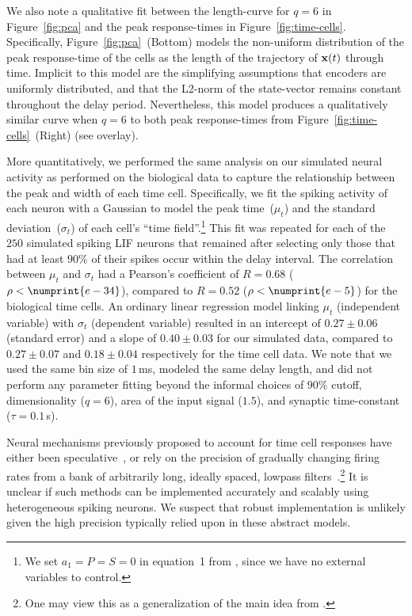 
We also note a qualitative fit between the length-curve for $q=6$ in Figure~\ref{fig:pca} and the peak response-times in Figure~\ref{fig:time-cells}.
Specifically, Figure~\ref{fig:pca}~(Bottom) models the non-uniform distribution of the peak response-time of the cells as the length of the trajectory of $\mathbf{x}(t)$ through time.
Implicit to this model are the simplifying assumptions that encoders are uniformly distributed, and that the L2-norm of the state-vector remains constant throughout the delay period.
Nevertheless, this model produces a qualitatively similar curve when $q = 6$ to both peak response-times from Figure~\ref{fig:time-cells}~(Right) (see overlay).

More quantitatively, we performed the same analysis on our simulated neural activity as \citet{tiganj2016sequential} performed on the biological data to capture the relationship between the peak and width of each time cell.
Specifically, we fit the spiking activity of each neuron with a Gaussian to model the peak time~($\mu_t$) and the standard deviation~($\sigma_t$) of each cell's ``time field''.\footnote{%
We set $a_1 = P = S = 0$ in equation~1 from \citet{tiganj2016sequential}, since we have no external variables to control.
}
This fit was repeated for each of the $250$ simulated spiking LIF neurons that remained after selecting only those that had at least $90\%$ of their spikes occur within the delay interval.
The correlation between $\mu_t$ and $\sigma_t$ had a Pearson's coefficient of $R = 0.68$ ($\rho < \numprint{e-34}$), compared to $R = 0.52$ ($\rho < \numprint{e-5}$) for the biological time cells.
An ordinary linear regression model linking $\mu_t$ (independent variable) with $\sigma_t$ (dependent variable) resulted in an intercept of $0.27 \pm 0.06$ (standard error) and a slope of $0.40 \pm 0.03$ for our simulated data, compared to $0.27 \pm 0.07$ and $0.18 \pm 0.04$ respectively for the time cell data.
We note that we used the same bin size of $1$\,ms, modeled the same delay length, and did not perform any parameter fitting beyond the informal choices of $90\%$ cutoff, dimensionality ($q=6$), area of the input signal ($1.5$), and synaptic time-constant ($\tau = 0.1$\,s).

Neural mechanisms previously proposed to account for time cell responses have either been speculative~\citep{tiganj2016sequential},
or rely on the precision of gradually changing firing rates from a bank of arbitrarily long, ideally spaced, lowpass filters~\citep{shankar2012scale, howard2014unified, tiganj2015simple, tiganj2017neural, zoran2018}.\footnote{%
One may view this as a generalization of the main idea from \citet{goldman2009memory}.
}
It is unclear if such methods can be implemented accurately and scalably using heterogeneous spiking neurons.
We suspect that robust implementation is unlikely given the high precision typically relied upon in these abstract models.

